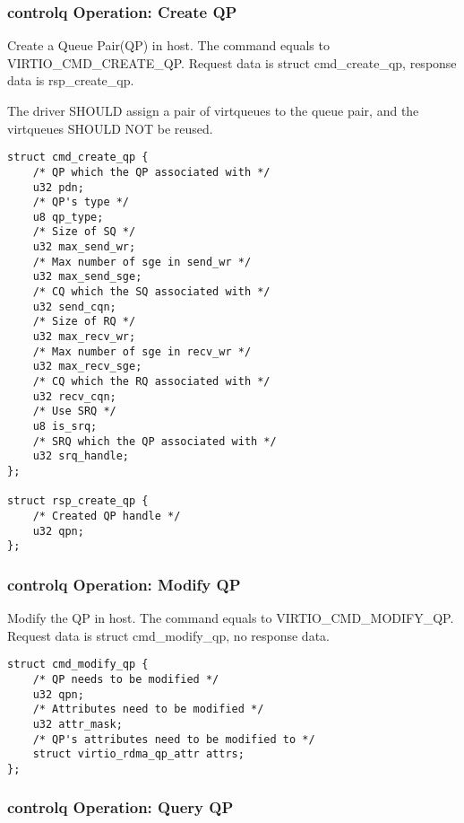\subsubsection{controlq Operation: Create QP}\label{sec:Device Types / RDMA Device / controlq Operation / Create QP}

Create a Queue Pair(QP) in host. The command equals to VIRTIO_CMD_CREATE_QP.
Request data is struct cmd_create_qp, response data is rsp_create_qp.

The driver SHOULD assign a pair of virtqueues to the queue pair, and the virtqueues SHOULD NOT be reused.

\begin{lstlisting}
struct cmd_create_qp {
    /* QP which the QP associated with */
    u32 pdn;
    /* QP's type */
    u8 qp_type;
    /* Size of SQ */
    u32 max_send_wr;
    /* Max number of sge in send_wr */
    u32 max_send_sge;
    /* CQ which the SQ associated with */
    u32 send_cqn;
    /* Size of RQ */
    u32 max_recv_wr;
    /* Max number of sge in recv_wr */
    u32 max_recv_sge;
    /* CQ which the RQ associated with */
    u32 recv_cqn;
    /* Use SRQ */
    u8 is_srq;
    /* SRQ which the QP associated with */
    u32 srq_handle;
};

struct rsp_create_qp {
    /* Created QP handle */
    u32 qpn;
};
\end{lstlisting}

\subsubsection{controlq Operation: Modify QP}\label{sec:Device Types / RDMA Device / controlq Operation / Modify QP}

Modify the QP in host. The command equals to VIRTIO_CMD_MODIFY_QP.
Request data is struct cmd_modify_qp, no response data.

\begin{lstlisting}
struct cmd_modify_qp {
    /* QP needs to be modified */
    u32 qpn;
    /* Attributes need to be modified */
    u32 attr_mask;
    /* QP's attributes need to be modified to */
    struct virtio_rdma_qp_attr attrs;
};
\end{lstlisting}

\subsubsection{controlq Operation: Query QP}\label{sec:Device Types / RDMA Device / controlq Operation / Query QP}

